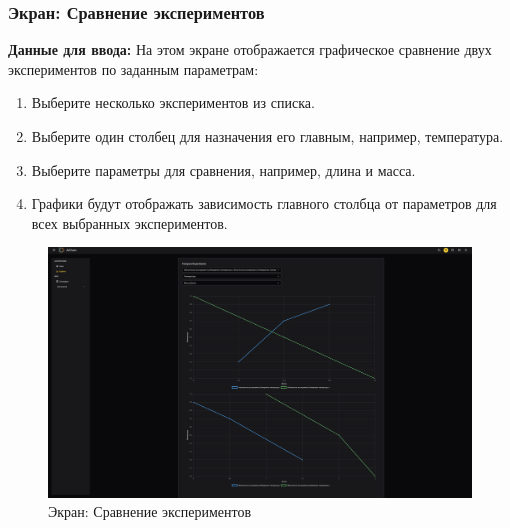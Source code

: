 \documentclass[a4paper,12pt,reqno]{article}
\begin{document}
\subsubsection{Экран: Сравнение экспериментов}
\textbf{Данные для ввода:}  
На этом экране отображается графическое сравнение двух экспериментов по заданным параметрам:
\begin{enumerate}
    \item Выберите несколько экспериментов из списка.
    \item Выберите один столбец для назначения его главным, например, температура.
    \item Выберите параметры для сравнения, например, длина и масса.
    \item Графики будут отображать зависимость главного столбца от параметров для всех выбранных экспериментов.
\end{enumerate}
\begin{figure}[H]
    \centering
    \includegraphics[width=\textwidth]{RO/img/multiple_doc.png} %
    \caption{Экран: Сравнение экспериментов}
    \label{fig:compare_experiments}
\end{figure}
\end{document}
